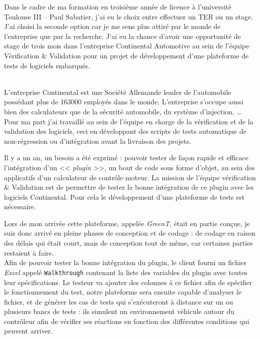 \documentclass[a4paper, 12pt]{article}
\begin{document}
	\maketitle
	Dans le cadre de ma formation en troisième année de licence à l'université Toulouse III -- Paul Sabatier, j'ai eu le choix entre effectuer un TER ou un
	stage.  J'ai choisi la seconde option car je me sens plus attiré par le monde de l'entreprise que par la recherche. J'ai eu la chance d’avoir une opportunité de stage de trois mois dans l'entreprise Continental Automotive au sein de l'équipe Vérification \& Validation pour un projet de développement
	d'une plateforme de tests de logiciels embarqués.\\~

	L'entreprise Continental est une Société Allemande leader de l'automobile possédant plus de 163000 employés dans le monde. L'entreprise s'occupe aussi bien des calculateurs que de la sécurité automobile, du système d'injection, \ldots \\
	Pour ma part j'ai travaillé au
	sein de l'équipe en charge de la vérification et de la validation des logiciels, ceci en développant des scripts de tests automatique de non-régression ou d'intégration avant la
	livraison des projets.

	Il y a un an, un besoin a été exprimé : pouvoir tester de façon rapide et efficace l'intégration d'un << \textit{plugin} >>, un bout de code sous forme
	d'objet,  au sein des applicatifs d'un calculateur de contrôle moteur. La mission de l'équipe vérification \& Validation est de permettre de tester la bonne intégration
	de ce plugin avec les logiciels Continental. Pour cela le développement d'une plateforme de tests est nécessaire.

	Lors de mon arrivée cette plateforme, appelée \textit{GreenT}, était en partie conçue, je suis donc arrivé en pleine phases de conception et de codage : de
	codage en raison des délais qui était court, mais de conception tout de même, car certaines parties restaient à faire.\\
	Afin de pouvoir tester la bonne intégration du plugin, le client fourni un fichier \textit{Excel} appelé \texttt{Walkthrough} contenant la liste des variables du plugin avec
toutes leur spécifications. Le testeur va ajouter des colonnes à ce fichier afin de spécifier le fonctionnement du test, notre plateforme sera ensuite
	capable d'analyser le fichier, et de générer les cas de tests qui s'exécuteront à distance sur un ou plusieurs bancs de tests : 
		ils simulent un environnement véhicule autour du
	contrôleur afin de vérifier ses réactions en fonction des différentes conditions qui peuvent arriver.
\end{document}
